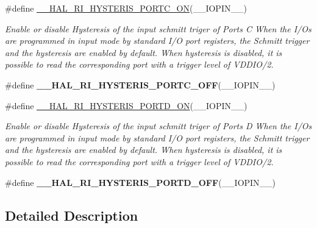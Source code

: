 \begin{DoxyCompactItemize}
\#define \hyperlink{group___r_i___hyst_config_ga9c36eeb08d67361ad75e414fa3a5d425}{\-\_\-\-\_\-\-H\-A\-L\-\_\-\-R\-I\-\_\-\-H\-Y\-S\-T\-E\-R\-I\-S\-\_\-\-P\-O\-R\-T\-C\-\_\-\-O\-N}(\-\_\-\-\_\-\-I\-O\-P\-I\-N\-\_\-\-\_\-)
\begin{DoxyCompactList}\small\item\em Enable or disable Hysteresis of the input schmitt triger of Ports C When the I/\-Os are programmed in input mode by standard I/\-O port registers, the Schmitt trigger and the hysteresis are enabled by default. When hysteresis is disabled, it is possible to read the corresponding port with a trigger level of V\-D\-D\-I\-O/2. \end{DoxyCompactList}\item 
\#define {\bfseries \-\_\-\-\_\-\-H\-A\-L\-\_\-\-R\-I\-\_\-\-H\-Y\-S\-T\-E\-R\-I\-S\-\_\-\-P\-O\-R\-T\-C\-\_\-\-O\-F\-F}(\-\_\-\-\_\-\-I\-O\-P\-I\-N\-\_\-\-\_\-)
\item 
\#define \hyperlink{group___r_i___hyst_config_ga6e0f3198dfce556529fc5b7fe9143c6c}{\-\_\-\-\_\-\-H\-A\-L\-\_\-\-R\-I\-\_\-\-H\-Y\-S\-T\-E\-R\-I\-S\-\_\-\-P\-O\-R\-T\-D\-\_\-\-O\-N}(\-\_\-\-\_\-\-I\-O\-P\-I\-N\-\_\-\-\_\-)
\begin{DoxyCompactList}\small\item\em Enable or disable Hysteresis of the input schmitt triger of Ports D When the I/\-Os are programmed in input mode by standard I/\-O port registers, the Schmitt trigger and the hysteresis are enabled by default. When hysteresis is disabled, it is possible to read the corresponding port with a trigger level of V\-D\-D\-I\-O/2. \end{DoxyCompactList}\item 
\#define {\bfseries \-\_\-\-\_\-\-H\-A\-L\-\_\-\-R\-I\-\_\-\-H\-Y\-S\-T\-E\-R\-I\-S\-\_\-\-P\-O\-R\-T\-D\-\_\-\-O\-F\-F}(\-\_\-\-\_\-\-I\-O\-P\-I\-N\-\_\-\-\_\-)
\end{DoxyCompactItemize}


\subsection{Detailed Description}


